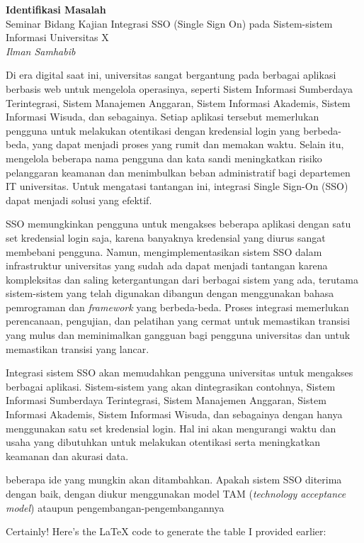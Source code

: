 \documentclass{article}
\begin{document}
\begin{center}
    \textbf{Identifikasi Masalah}\\
    Seminar Bidang Kajian
    \bigbreak
    Integrasi SSO (Single Sign On) pada Sistem-sistem Informasi Universitas X
    \\ \emph{Ilman Samhabib}
\end{center}
Di era digital saat ini,
universitas sangat bergantung
pada berbagai aplikasi berbasis web untuk mengelola operasinya,
seperti Sistem Informasi Sumberdaya Terintegrasi, Sistem Manajemen Anggaran, Sistem Informasi Akademis, Sistem Informasi Wisuda, dan sebagainya.
Setiap aplikasi tersebut memerlukan pengguna untuk
melakukan otentikasi dengan kredensial
login yang berbeda-beda,
yang dapat menjadi proses yang
rumit dan memakan waktu.
Selain itu, mengelola beberapa nama pengguna
dan kata sandi meningkatkan risiko pelanggaran
keamanan dan menimbulkan beban administratif
bagi departemen IT universitas.
Untuk mengatasi tantangan ini, integrasi Single Sign-On (SSO) dapat menjadi solusi yang efektif.

SSO memungkinkan pengguna untuk mengakses
beberapa aplikasi dengan satu set kredensial
login saja, karena banyaknya kredensial yang diurus sangat membebani pengguna.
Namun, mengimplementasikan sistem SSO dalam
infrastruktur universitas yang sudah ada dapat menjadi
tantangan karena kompleksitas
dan saling ketergantungan dari berbagai sistem yang ada,
terutama sistem-sistem yang telah digunakan dibangun dengan menggunakan bahasa pemrograman dan \emph{framework} yang berbeda-beda.
Proses integrasi memerlukan perencanaan,
pengujian, dan pelatihan yang cermat untuk
memastikan transisi yang mulus
dan meminimalkan gangguan bagi
pengguna universitas dan
untuk memastikan transisi yang lancar.


Integrasi
sistem SSO akan memudahkan pengguna
universitas untuk mengakses berbagai aplikasi.
Sistem-sistem yang akan dintegrasikan contohnya,
Sistem Informasi Sumberdaya Terintegrasi,
Sistem Manajemen Anggaran,
Sistem Informasi Akademis,
Sistem Informasi Wisuda,
dan sebagainya dengan hanya menggunakan satu
set kredensial login.
Hal ini akan mengurangi waktu
dan usaha yang dibutuhkan untuk melakukan
otentikasi serta meningkatkan keamanan dan akurasi data.

\bigbreak
beberapa ide yang mungkin akan ditambahkan.
Apakah sistem SSO diterima dengan baik,
dengan diukur menggunakan model TAM (\emph{technology acceptance model}) ataupun pengembangan-pengembangannya

Certainly! Here's the LaTeX code to generate the table I provided earlier:
\end{document}
